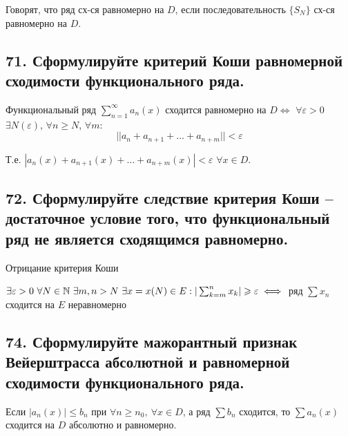 \documentclass[a4paper, fleqn]{article}
\begin{document}
        Говорят, что ряд сх-ся равномерно на $D$, если последовательность $\{ S_N \}$ сх-ся равномерно на $D$.
        
        
        
    \subsection*{71. Сформулируйте критерий Коши равномерной сходимости функционального ряда.}
    Функциональный ряд $\sum_{n=1}^{\infty} a_n(x)$ сходится равномерно на $D \iff$ $\forall \varepsilon > 0$ $\exists N(\varepsilon)$, $\forall n \geq N$, $\forall m$: 
    $$||a_n + a_{n + 1} + \dots + a_{n + m}|| < \varepsilon$$
            
    Т.е. $|a_n(x) + a_{n + 1}(x) + \dots + a_{n + m}(x)| < \varepsilon$ $\forall x \in D$.
        
        \subsection*{72. Сформулируйте следствие критерия Коши -- достаточное условие того, что функциональный ряд не является сходящимся равномерно.}
        Отрицание критерия Коши 
            
        $\exists \varepsilon > 0\ \forall N \in \mathbb{N}\ \exists m,n > N\ \exists x = x(N) \in E: |\sum_{k = m}^n x_k| \geqslant \varepsilon \iff$ ряд $\sum x_n$ сходится на $E$ неравномерно
            
        
    \subsection*{74. Сформулируйте мажорантный признак Вейерштрасса абсолютной и равномерной сходимости функционального ряда.}
    \begin{proposition}
        Если $\left|a_n(x)\right| \leq b_n$ при $\forall n \geq n_0,\ \forall x \in D$, а ряд $\sum b_n$ сходится, то $\sum a_n(x)$ сходится на $D$ абсолютно и равномерно.
    \end{proposition}
        
\end{document}
